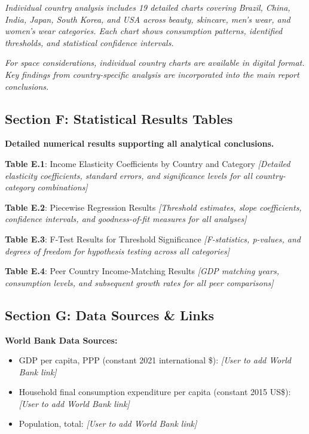 \documentclass[11pt]{article}
\begin{document}
\textit{Individual country analysis includes 19 detailed charts covering Brazil, China, India, Japan, South Korea, and USA across beauty, skincare, men's wear, and women's wear categories. Each chart shows consumption patterns, identified thresholds, and statistical confidence intervals.}

\textit{For space considerations, individual country charts are available in digital format. Key findings from country-specific analysis are incorporated into the main report conclusions.}

\subsection*{Section F: Statistical Results Tables}

\textbf{Detailed numerical results supporting all analytical conclusions.}

\textbf{Table E.1}: Income Elasticity Coefficients by Country and Category
\textit{[Detailed elasticity coefficients, standard errors, and significance levels for all country-category combinations]}

\textbf{Table E.2}: Piecewise Regression Results  
\textit{[Threshold estimates, slope coefficients, confidence intervals, and goodness-of-fit measures for all analyses]}

\textbf{Table E.3}: F-Test Results for Threshold Significance
\textit{[F-statistics, p-values, and degrees of freedom for hypothesis testing across all categories]}

\textbf{Table E.4}: Peer Country Income-Matching Results
\textit{[GDP matching years, consumption levels, and subsequent growth rates for all peer comparisons]}

\subsection*{Section G: Data Sources \& Links}

\textbf{World Bank Data Sources:}
\begin{itemize}
    \item GDP per capita, PPP (constant 2021 international \$): \textit{[User to add World Bank link]}
    \item Household final consumption expenditure per capita (constant 2015 US\$): \textit{[User to add World Bank link]}
    \item Population, total: \textit{[User to add World Bank link]}
\end{itemize}
\end{document}
